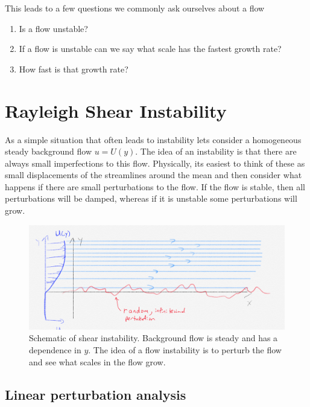 \documentclass[11pt]{article}
\begin{document}
This leads to a few questions we commonly ask ourselves about a flow
\begin{enumerate}
  \item Is a flow unstable? 
  \item If a flow is unstable can we say what scale has the fastest growth
rate?
  \item How fast is that growth rate?   
\end{enumerate}

\section{Rayleigh Shear Instability}

As a simple situation that often leads to instability lets consider a
homogeneous steady background flow $u = U(y)$.  The idea of an instability is
that there are always small imperfections to this flow.  Physically, its
easiest to think of these as small displacements of the streamlines around the
mean and then consider what happens if there are small perturbations to the
flow.  If the flow is stable, then all perturbations will be damped, whereas if
it is unstable some perturbations will grow. 


\begin{figure}[hbtp]
  \begin{center}
    \includegraphics[width=5in]{images/ShearInstabilitySketch.png} 
    \caption{Schematic of shear instability.  Background flow is steady and has
a dependence in $y$. The idea of a flow instability is to perturb the flow and
see what scales in the flow grow.   }
    \label{fig:Instability}
  \end{center}
\end{figure}

\subsection{Linear perturbation analysis}
\end{document}

